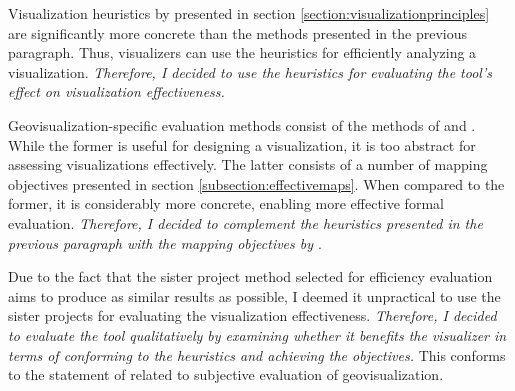 Visualization heuristics by \citet{zuk_heuristics_2006} presented in section \ref{section:visualizationprinciples} are significantly more concrete than the methods presented in the previous paragraph. Thus, visualizers can use the heuristics for efficiently analyzing a visualization. \emph{Therefore, I decided to use the heuristics for evaluating the tool's effect on visualization effectiveness.}

Geovisualization-specific evaluation methods consist of the methods of \citet{kraak_cartographic_1998} and \citet{schlichtmann_visualization_2002}. While the former is useful for designing a visualization, it is too abstract for assessing visualizations effectively. The latter consists of a number of mapping objectives presented in section \ref{subsection:effectivemaps}. When compared to the former, it is considerably more concrete, enabling more effective formal evaluation. \emph{Therefore, I decided to complement the heuristics presented in the previous paragraph with the mapping objectives by \citet{schlichtmann_visualization_2002}}.

Due to the fact that the sister project method selected for efficiency evaluation aims to produce as similar results as possible, I deemed it unpractical to use the sister projects for evaluating the visualization effectiveness. \emph{Therefore, I decided to evaluate the tool qualitatively by examining whether it benefits the visualizer in terms of conforming to the heuristics and achieving the objectives.} This conforms to the statement of \citet{kraak_cartographic_1998} related to subjective evaluation of geovisualization.
